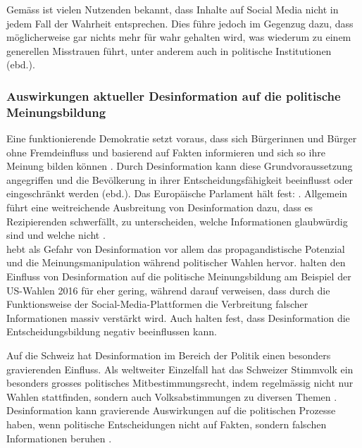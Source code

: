 \documentclass[12pt,a4paper]{article}        %
\begin{document}
Gemäss \textcite[183]{weidner_fake_2019} ist vielen Nutzenden bekannt, dass Inhalte auf Social Media nicht in jedem Fall der Wahrheit entsprechen. Dies führe jedoch im Gegenzug dazu, dass möglicherweise gar nichts mehr für wahr gehalten wird, was wiederum zu einem generellen Misstrauen führt, unter anderem auch in politische Institutionen (ebd.).

\subsubsection{Auswirkungen aktueller Desinformation auf die politische Meinungsbildung}
Eine funktionierende Demokratie setzt voraus, dass sich Bürgerinnen und Bürger ohne Fremdeinfluss und basierend auf Fakten informieren und sich so ihre Meinung bilden können \parencite[26]{vogler_wahrnehmung_2021}. Durch Desinformation kann diese Grundvoraussetzung angegriffen und die Bevölkerung in ihrer Entscheidungsfähigkeit beeinflusst oder eingeschränkt werden (ebd.).
Das Europäische Parlament hält fest:  \parencite[13]{european_parliament_directorate-general_for_external_policies_of_the_union_impact_2021} \parencites[vgl.\ auch][16]{reuter_fake_2019}[26]{vogler_wahrnehmung_2021}[19]{grujic_warnhinweise_2024}{schmidt_meinungsbildung_2022}. Allgemein führt eine weitreichende Ausbreitung von Desinformation dazu, dass es Rezipierenden schwerfällt, zu unterscheiden, welche Informationen glaubwürdig sind und welche nicht \parencite[3697]{weikmann_visual_2023}.\\
\Textcite[170]{wahl_fake_2021} hebt als Gefahr von Desinformation vor allem das propagandistische Potenzial und die Meinungsmanipulation während politischer Wahlen hervor. \textcite{allcott_social_2017} halten den Einfluss von Desinformation auf die politische Meinungsbildung am Beispiel der US-Wahlen 2016 für eher gering, während \textcite[1095]{lazer_science_2018} darauf verweisen, dass durch die Funktionsweise der Social-Media-Plattformen die Verbreitung falscher Informationen massiv verstärkt wird. Auch \textcite[26]{vogler_wahrnehmung_2021} halten fest, dass Desinformation die Entscheidungsbildung negativ beeinflussen kann.

Auf die Schweiz hat Desinformation im Bereich der Politik einen besonders gravierenden Einfluss. Als weltweiter Einzelfall hat das Schweizer Stimmvolk ein besonders grosses politisches Mitbestimmungsrecht, indem regelmässig nicht nur Wahlen stattfinden, sondern auch Volksabstimmungen zu diversen Themen \parencite[2]{sager_politische_2017}. Desinformation kann gravierende Auswirkungen auf die politischen Prozesse haben, wenn politische Entscheidungen nicht auf Fakten, sondern falschen Informationen beruhen \parencites[26]{vogler_wahrnehmung_2021}[vgl.\ auch][19]{grujic_warnhinweise_2024}.
\end{document}
